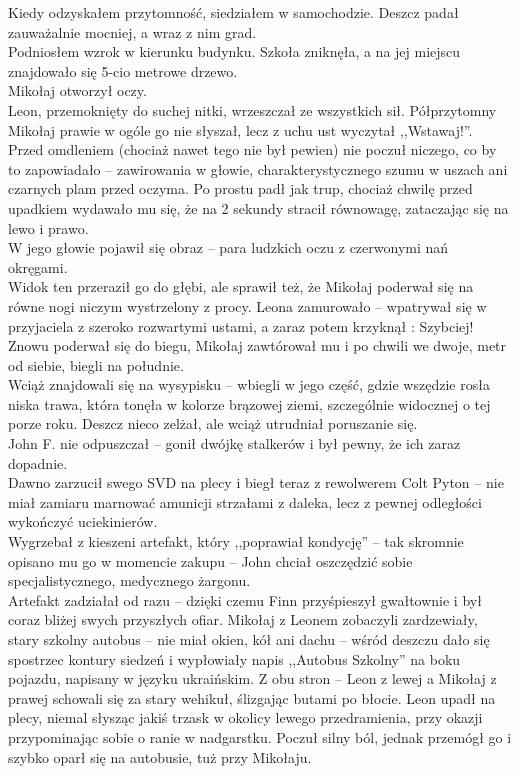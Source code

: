 \documentclass[../MAIN.tex]{subfiles}
\begin{document}
Kiedy odzyskałem przytomność, siedziałem w samochodzie. Deszcz padał zauważalnie mocniej, a wraz z nim grad.\\
Podniosłem wzrok w kierunku budynku.
Szkoła zniknęła, a na jej miejscu znajdowało się 5-cio metrowe drzewo.\\
Mikołaj otworzył oczy.\\
Leon, przemoknięty do suchej nitki, wrzeszczał ze wszystkich sił. Półprzytomny Mikołaj prawie w ogóle go nie słyszał, lecz z uchu ust wyczytał ,,Wstawaj!''. \\
Przed omdleniem (chociaż nawet tego nie był pewien) nie poczuł niczego, co by to zapowiadało -- zawirowania w głowie, charakterystycznego szumu w uszach ani czarnych plam przed oczyma. Po prostu padł jak trup, chociaż chwilę przed upadkiem wydawało mu się, że na 2 sekundy stracił równowagę, zataczając się na lewo i prawo. \\
W jego głowie pojawił się obraz -- para ludzkich oczu z czerwonymi nań okręgami. \\
Widok ten przeraził go do głębi, ale sprawił też, że Mikołaj poderwał się na równe nogi niczym wystrzelony z procy. Leona zamurowało -- wpatrywał się w przyjaciela z szeroko rozwartymi ustami, a zaraz potem krzyknął :
%
\sx Szybciej!
\qd
Znowu poderwał się do biegu, Mikołaj zawtórował mu i po chwili we dwoje, metr od siebie, biegli na południe. \\
Wciąż znajdowali się na wysypisku --  wbiegli w jego część, gdzie wszędzie rosła niska trawa, która tonęła w kolorze brązowej ziemi, szczególnie widocznej o tej porze roku. Deszcz nieco zelżał, ale wciąż utrudniał poruszanie się. \\
John F. nie odpuszczał -- gonił dwójkę stalkerów i był pewny, że ich zaraz dopadnie.\\
Dawno zarzucił swego SVD na plecy i biegł teraz z rewolwerem Colt Pyton -- nie miał zamiaru marnować amunicji strzałami z daleka, lecz z pewnej odległości wykończyć uciekinierów.\\
Wygrzebał z kieszeni artefakt, który ,,poprawiał kondycję'' -- tak skromnie opisano mu go w momencie zakupu -- John chciał oszczędzić sobie specjalistycznego, medycznego żargonu. \\
Artefakt zadziałał od razu -- dzięki czemu Finn przyśpieszył gwałtownie i był coraz bliżej swych przyszłych ofiar.
%
%
Mikołaj z Leonem zobaczyli zardzewiały, stary szkolny autobus -- nie miał okien, kół ani dachu -- wśród deszczu dało się spostrzec kontury siedzeń i wypłowiały napis ,,Autobus Szkolny'' na boku pojazdu, napisany w języku ukraińskim. Z obu stron -- Leon z lewej a Mikołaj z prawej schowali się za stary wehikuł, ślizgając butami po błocie. Leon upadł na plecy, niemal słysząc jakiś trzask w okolicy lewego przedramienia, przy okazji przypominając sobie o ranie w nadgarstku. Poczuł silny ból, jednak przemógł go i szybko oparł się na autobusie, tuż przy Mikołaju.
\end{document}
